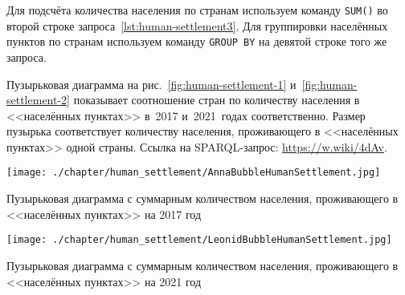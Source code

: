 Для подсчёта количества населения по странам 
используем команду \lstinline|SUM()| во второй строке запроса~\ref{lst:human-settlement3}. 
Для группировки населённых пунктов по странам 
используем команду \lstinline|GROUP BY| на девятой строке того же запроса.

Пузырьковая диаграмма на рис.~\ref{fig:human-settlement-1} и~\ref{fig:human-settlement-2} 
показывает соотношение стран по количеству населения в <<населённых пунктах>> 
в~2017 и~2021~годах соответственно. 
Размер пузырька соответствует количеству населения, проживающего в <<населённых пунктах>> одной страны. 
Ссылка на SPARQL-запрос: \href{https://w.wiki/4dAv}{https://w.wiki/4dAv}.

\begin{marginfigure}[0.0cm]
	    \texttt{[image: ./chapter/human\_settlement/AnnaBubbleHumanSettlement.jpg]}
        \caption[Сколько населения проживает в населённых пунктах, 2017.]{Пузырьковая диаграмма с суммарным количеством населения, проживающего в <<населённых пунктах>> на 2017 год} 
	    \label{fig:human-settlement-1}
\end{marginfigure}
\begin{marginfigure}[0.0cm]
	\texttt{[image: ./chapter/human\_settlement/LeonidBubbleHumanSettlement.jpg]}
    \caption[Сколько населения проживает в населённых пунктах, 2021.]{Пузырьковая диаграмма с суммарным количеством населения, проживающего в <<населённых пунктах>> на 2021 год} 
	\label{fig:human-settlement-2}
\end{marginfigure}




